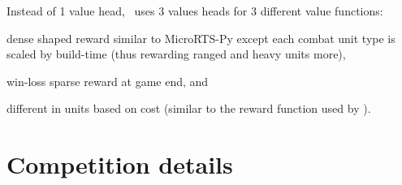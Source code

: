 \documentclass{article}
\begin{document}
Instead of 1 value head, \agentName\ uses 3 values heads for 3 different value
functions:
\begin{inparaenum}[(1)]
    \item dense shaped reward similar to MicroRTS-Py except each combat unit type is
    scaled by build-time (thus rewarding ranged and heavy units more),
    \item win-loss sparse reward at game end, and
    \item different in units based on cost (similar to the reward function used by \citet{Winter2021}).
\end{inparaenum}




\clearpage

\appendix
\section{Competition details}
\end{document}
